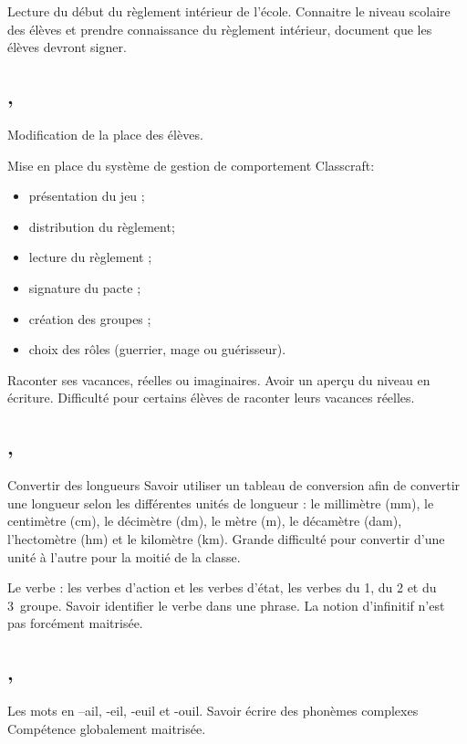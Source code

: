 \documentclass{article}
\begin{document}
\emc Lecture du début du règlement intérieur de l’école.
\obj Connaitre le niveau scolaire des élèves et prendre connaissance du règlement intérieur, document que les élèves devront signer.


\subsection{ \sep}
Modification de la place des élèves.

Mise en place du système de gestion de comportement Classcraft:
\begin{itemize}
	\item présentation du jeu ;
	\item distribution du règlement;
	\item lecture du règlement ;
	\item signature du pacte ;
	\item création des groupes ;
	\item choix des rôles (guerrier, mage ou guérisseur).
\end{itemize}\vspace{1ex}

\ecr Raconter ses vacances, réelles ou imaginaires.
\obj Avoir un aperçu du niveau en écriture.
\bil Difficulté pour certains élèves de raconter leurs vacances réelles.


\subsection{ \sep}
\gem\ham Convertir des longueurs
\obj Savoir utiliser un tableau de conversion afin de convertir une longueur selon les différentes unités de longueur : le millimètre (mm), le centimètre (cm), le décimètre (dm), le mètre (m), le décamètre (dam), l’hectomètre (hm) et le kilomètre (km).
\bil Grande difficulté pour convertir d’une unité à l’autre pour la moitié de la classe.

\gra\hpm Le verbe : les verbes d’action et les verbes d’état, les verbes du 1\ier{}, du 2\ieme{} et du 3\ieme{}~groupe.
\obj Savoir identifier le verbe dans une phrase.
\bil La notion d’infinitif n’est pas forcément maitrisée.


\subsection{ \sep}
\ort\ham Les mots en –ail, -eil, -euil et -ouil.
\obj Savoir écrire des phonèmes complexes
\bil Compétence globalement maitrisée.
\end{document}
